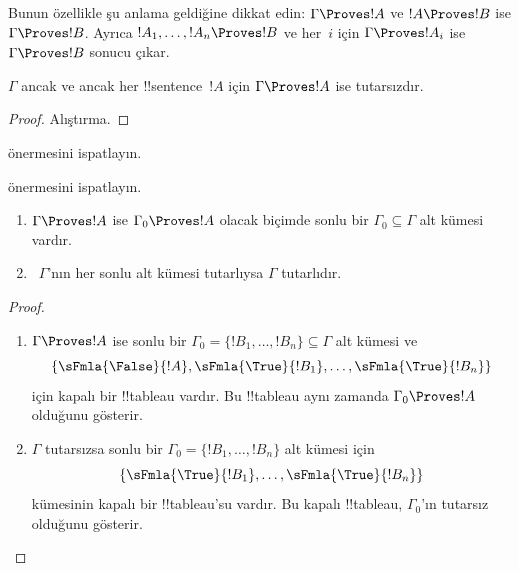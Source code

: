 \documentclass[../../../include/open-logic-section]{subfiles}
\begin{document}
Bunun özellikle şu anlama geldiğine dikkat edin: $\Gamma \Proves !A$ ve
$!A \Proves !B$ ise $\Gamma \Proves !B$. Ayrıca $!A_1,
\dots, !A_n \Proves !B$ ve her~$i$ için $\Gamma \Proves !A_i$ ise
$\Gamma \Proves !B$ sonucu çıkar.

\begin{prop}
$\Gamma$ ancak ve ancak her !!{sentence}~$!A$ için $\Gamma \Proves !A$
ise tutarsızdır.
\end{prop}

\begin{proof}
Alıştırma.
\end{proof}

\begin{prob}
 önermesini ispatlayın.
\end{prob}
\tagendprob

\begin{prob}
 önermesini ispatlayın.
\end{prob}
\tagendprob

\begin{prop}[Kompaktlık]
  \begin{enumerate}
  \item $\Gamma \Proves !A$ ise $\Gamma_0 \Proves !A$ olacak biçimde sonlu
    bir $\Gamma_0 \subseteq \Gamma$ alt kümesi vardır.
  \item ~$\Gamma$'nın her sonlu alt kümesi tutarlıysa $\Gamma$ tutarlıdır.
  \end{enumerate}
\end{prop}

\begin{proof}
  \begin{enumerate}
    \item $\Gamma \Proves !A$ ise sonlu bir
      $\Gamma_0 = \{!B_1, \dots, !B_n\} \subseteq \Gamma$ alt kümesi ve
      \[
      \{\sFmla{\False}{!A}, \sFmla{\True}{!B_1}, \dots, \sFmla{\True}{!B_n}\}
      \]
      için kapalı bir !!{tableau} vardır. Bu !!{tableau} aynı zamanda
      $\Gamma_0 \Proves !A$ olduğunu gösterir.
    \item $\Gamma$ tutarsızsa sonlu bir
      $\Gamma_0 = \{!B_1, \dots, !B_n\}$ alt kümesi için
      \[
      \{\sFmla{\True}{!B_1}, \dots, \sFmla{\True}{!B_n}\}
      \]
      kümesinin kapalı bir !!{tableau}'su vardır. Bu kapalı !!{tableau},
      $\Gamma_0$'ın tutarsız olduğunu gösterir.
  \end{enumerate}
\end{proof}
\end{document}
